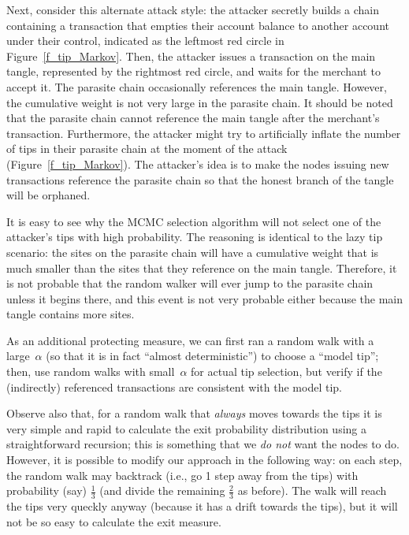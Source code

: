 \documentclass[12pt]{article}
\begin{document}
\begin{CJK}{UTF8}{bkai}
Next, consider this alternate attack style: the attacker secretly builds
a chain 
 containing a transaction that empties their account balance to 
another account under their control, indicated as the leftmost red
circle in Figure~\ref{f_tip_Markov}. Then, the attacker
issues a transaction on the main tangle, represented by the rightmost red circle,
and waits for the merchant to accept it. The parasite chain occasionally
references the main tangle. However, the cumulative weight is not very 
large in the parasite chain. It should be noted that the parasite chain cannot 
reference the main tangle after the merchant's transaction. Furthermore, 
the attacker might try to artificially
inflate the number of tips in their parasite chain 
at the moment of the attack (Figure~\ref{f_tip_Markov}).
The attacker's idea is to make the nodes issuing new transactions 
reference the parasite chain so that the honest branch of the tangle will
be orphaned.

It is easy to see why the MCMC selection algorithm
 will not select one of the attacker's tips with high probability.
The reasoning is identical to the lazy tip scenario:
 the sites on the parasite chain will
have a cumulative weight that is much smaller 
than the sites that they reference on the main tangle.
 Therefore, it is not probable that the random
walker will ever jump to the parasite chain unless it begins there,
and this event is not very probable either because the main tangle contains
more sites. 

As an additional protecting measure, we can 
first ran a random walk with a large~$\alpha$ (so that it is 
in fact ``almost deterministic'') to choose a 
 ``model tip''; then, use random walks with small~$\alpha$
for actual tip selection, but verify if the (indirectly)
referenced transactions are consistent with the model tip.

Observe also that,
for a random walk that \emph{always} moves towards the tips 
it is very simple and rapid to calculate the exit probability distribution using a straightforward recursion; this is something
that we \emph{do not} want the nodes to do. 
However, it is possible to modify our approach in the following
way: on each step, the random walk may
 backtrack (i.e., go 1 step away from the tips) 
with probability (say) $\frac{1}{3}$ 
(and divide the remaining $\frac{2}{3}$ as before). 
The walk will reach the tips very queckly anyway 
(because it has a drift towards the tips), 
but it will not be so easy to calculate the exit measure. 


\end{CJK}
\end{document}
